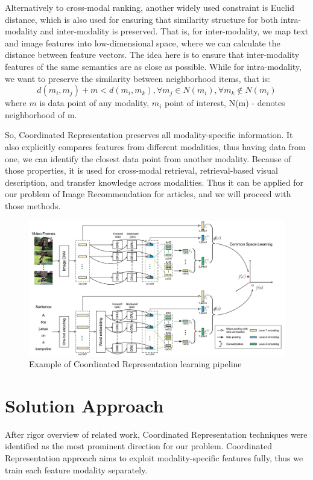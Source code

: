 \documentclass[runningheads]{llncs}
\begin{document}
Alternatively to cross-modal ranking, another widely used constraint is Euclid distance, which is also used for ensuring that similarity structure for both intra-modality and inter-modality is preserved. That is, for inter-modality, we map text and image features into low-dimensional space, where we can calculate the distance between feature vectors. The idea here is to ensure that inter-modality features of the same semantics are as close as possible\cite{ref_pan}. While for intra-modality, we want to preserve the similarity between neighborhood items, that is:
\begin{equation} \label{eq_eucl_loss}
d(m_i, m_j) + m < d(m_i, m_k), \forall m_j \in N(m_i), \forall m_k \notin N(m_i)
\end{equation}
where $m$ is data point of any modality, $m_i$ point of interest, N(m) - denotes neighborhood of m\cite{ref_wang}.

So, Coordinated Representation preserves all modality-specific information. It also explicitly compares features from different modalities, thus having data from one, we can identify the closest data point from another modality. Because of those properties, it is used for cross-modal retrieval\cite{ref_wang}, retrieval-based visual description\cite{ref_socher}, and transfer knowledge across modalities\cite{ref_pan}. Thus it can be applied for our problem of Image Recommendation for articles, and we will proceed with those methods.

\begin{figure}
\includegraphics[width=\textwidth]{dual_encoding.jpg}
\caption{Example of Coordinated Representation learning pipeline\cite{ref_dual_encoding}} \label{fig2}
\end{figure}

\section{Solution Approach}
After rigor overview of related work, Coordinated Representation techniques were identified as the most prominent direction for our problem. Coordinated Representation approach aims to exploit modality-specific features fully, thus we train each feature modality separately.
\end{document}
